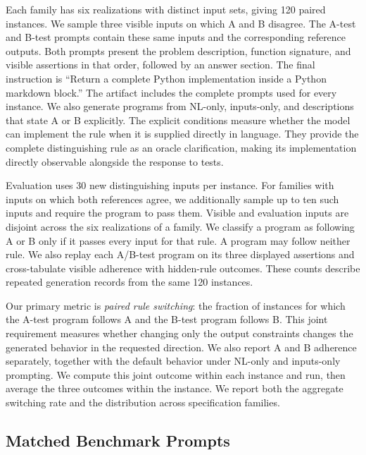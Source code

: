 \documentclass[acmsmall,screen,review,anonymous]{acmart}
\begin{document}
Each family has six realizations with distinct input sets, giving 120 paired instances.
We sample three visible inputs on which A and B disagree.
The A-test and B-test prompts contain these same inputs and the corresponding reference outputs.
Both prompts present the problem description, function signature, and visible assertions in that order, followed by an answer section.
The final instruction is ``Return a complete Python implementation inside a Python markdown block.''
The artifact includes the complete prompts used for every instance.
We also generate programs from NL-only, inputs-only, and descriptions that state A or B explicitly.
The explicit conditions measure whether the model can implement the rule when it is supplied directly in language.
They provide the complete distinguishing rule as an oracle clarification, making its implementation directly observable alongside the response to tests.

Evaluation uses 30 new distinguishing inputs per instance.
For families with inputs on which both references agree, we additionally sample up to ten such inputs and require the program to pass them.
Visible and evaluation inputs are disjoint across the six realizations of a family.
We classify a program as following A or B only if it passes every input for that rule.
A program may follow neither rule.
We also replay each A/B-test program on its three displayed assertions and cross-tabulate visible adherence with hidden-rule outcomes.
These counts describe repeated generation records from the same 120 instances.

Our primary metric is \emph{paired rule switching}: the fraction of instances for which the A-test program follows A and the B-test program follows B.
This joint requirement measures whether changing only the output constraints changes the generated behavior in the requested direction.
We also report A and B adherence separately, together with the default behavior under NL-only and inputs-only prompting.
We compute this joint outcome within each instance and run, then average the three outcomes within the instance.
We report both the aggregate switching rate and the distribution across specification families.

\subsection{Matched Benchmark Prompts}
\end{document}
